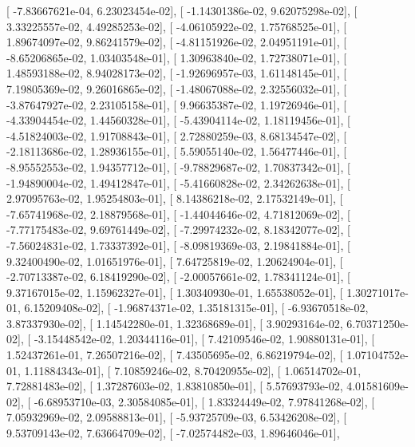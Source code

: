 \documentclass{article}
\begin{document}
       [ -7.83667621e-04,   6.23023454e-02],
       [ -1.14301386e-02,   9.62075298e-02],
       [  3.33225557e-02,   4.49285253e-02],
       [ -4.06105922e-02,   1.75768525e-01],
       [  1.89674097e-02,   9.86241579e-02],
       [ -4.81151926e-02,   2.04951191e-01],
       [ -8.65206865e-02,   1.03403548e-01],
       [  1.30963840e-02,   1.72738071e-01],
       [  1.48593188e-02,   8.94028173e-02],
       [ -1.92696957e-03,   1.61148145e-01],
       [  7.19805369e-02,   9.26016865e-02],
       [ -1.48067088e-02,   2.32556032e-01],
       [ -3.87647927e-02,   2.23105158e-01],
       [  9.96635387e-02,   1.19726946e-01],
       [ -4.33904454e-02,   1.44560328e-01],
       [ -5.43904114e-02,   1.18119456e-01],
       [ -4.51824003e-02,   1.91708843e-01],
       [  2.72880259e-03,   8.68134547e-02],
       [ -2.18113686e-02,   1.28936155e-01],
       [  5.59055140e-02,   1.56477446e-01],
       [ -8.95552553e-02,   1.94357712e-01],
       [ -9.78829687e-02,   1.70837342e-01],
       [ -1.94890004e-02,   1.49412847e-01],
       [ -5.41660828e-02,   2.34262638e-01],
       [  2.97095763e-02,   1.95254803e-01],
       [  8.14386218e-02,   2.17532149e-01],
       [ -7.65741968e-02,   2.18879568e-01],
       [ -1.44044646e-02,   4.71812069e-02],
       [ -7.77175483e-02,   9.69761449e-02],
       [ -7.29974232e-02,   8.18342077e-02],
       [ -7.56024831e-02,   1.73337392e-01],
       [ -8.09819369e-03,   2.19841884e-01],
       [  9.32400490e-02,   1.01651976e-01],
       [  7.64725819e-02,   1.20624904e-01],
       [ -2.70713387e-02,   6.18419290e-02],
       [ -2.00057661e-02,   1.78341124e-01],
       [  9.37167015e-02,   1.15962327e-01],
       [  1.30340930e-01,   1.65538052e-01],
       [  1.30271017e-01,   6.15209408e-02],
       [ -1.96874371e-02,   1.35181315e-01],
       [ -6.93670518e-02,   3.87337930e-02],
       [  1.14542280e-01,   1.32368689e-01],
       [  3.90293164e-02,   6.70371250e-02],
       [ -3.15448542e-02,   1.20344116e-01],
       [  7.42109546e-02,   1.90880131e-01],
       [  1.52437261e-01,   7.26507216e-02],
       [  7.43505695e-02,   6.86219794e-02],
       [  1.07104752e-01,   1.11884343e-01],
       [  7.10859246e-02,   8.70420955e-02],
       [  1.06514702e-01,   7.72881483e-02],
       [  1.37287603e-02,   1.83810850e-01],
       [  5.57693793e-02,   4.01581609e-02],
       [ -6.68953710e-03,   2.30584085e-01],
       [  1.83324449e-02,   7.97841268e-02],
       [  7.05932969e-02,   2.09588813e-01],
       [ -5.93725709e-03,   6.53426208e-02],
       [  9.53709143e-02,   7.63664709e-02],
       [ -7.02574482e-03,   1.89646046e-01],
\end{document}
